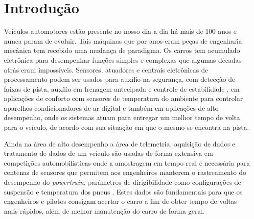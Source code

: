 \chapter{Introdução} 
	\label{ch:introducao}

Veículos automotores estão presente no nosso dia a dia há mais de 100 anos \cite{fordt} e nunca param de evoluir. Tais  máquinas que por anos eram peças de engenharia mecânica tem recebido uma mudança de paradigma. Os carros tem acumulado eletrônica para desempenhar funções simples e complexas que algumas décadas atrás eram impossíveis. Sensores, atuadores e centrais eletrônicas de processamento podem ser usados para auxílio na segurança, com detecção de faixas de pista, auxílio em frenagem antecipada e controle de estabilidade \cite{racecarInstrumentationFor2012}, em aplicações de conforto com sensores de temperatura do ambiente para controlar aparelhos condicionadores de ar digital e também em aplicações de alto desempenho, onde os sistemas atuam para entregar um melhor tempo de volta para o veículo, de acordo com sua situação em que o mesmo se encontra na pista.

Ainda na área de alto desempenho a área de telemetria, aquisição de dados e tratamento de dados de um veículo são usadas de forma extensiva em competições automobilísticas onde a amostragem em tempo real é necessária para centenas de sensores que permitem aos engenheiros manterem o rastreamento do desempenho do \textit{powertrain}, parâmetros de dirigibilidade como configurações de suspensão e temperatura dos pneus \cite{designAndImplementation2015}. Estes dados são fundamentais para que os engenheiros e pilotos consigam acertar o carro a fim de obter tempo de voltas mais rápidos, além de melhor manutenção do carro de forma geral.

